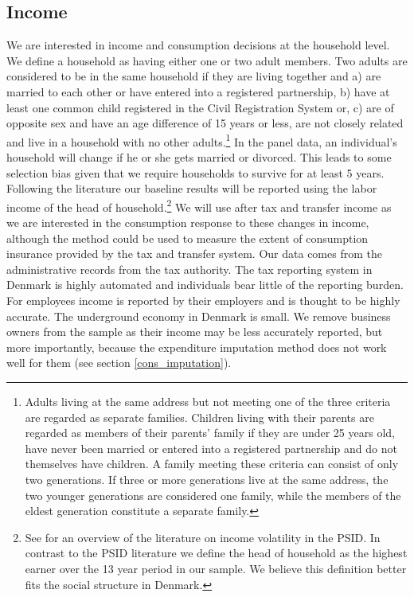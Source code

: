 \documentclass[titlepage]{\econtex}\newcommand{\texname}{ConsumptionHeterogeneity}
\begin{document}
\subsection{Income} \label{income}
We are interested in income and consumption decisions at the household level. We define a household as having either one or two adult members. Two adults are considered to be in the same household if they are living together and a) are married to each other or have entered into a registered partnership, b) have at least one common child registered in the Civil Registration System or, c) are of opposite sex and have an age difference of 15 years or less, are not closely related and live in a household with no other adults.\footnote{Adults living at the same address but not meeting one of the three criteria are regarded as separate families. Children living with their parents are regarded as members of their parents' family if they are under 25 years old, have never been married or entered into a registered partnership and do not themselves have children. A family meeting these criteria can consist of only two generations. If three or more generations live at the same address, the two younger generations are considered one family, while the members of the eldest generation constitute a separate family.} In the panel data, an individual's household will change if he or she gets married or divorced. This leads to some selection bias given that we require households to survive for at least 5 years. Following the literature our baseline results will be reported using the labor income of the head of household.\footnote{See \cite{moffitt_income_2018} for an overview of the literature on income volatility in the PSID. In contrast to the PSID literature we define the head of household as the highest earner over the 13 year period in our sample. We believe this definition better fits the social structure in Denmark.} We will use after tax and transfer income as we are interested in the consumption response to these changes in income, although the method could be used to measure the extent of consumption insurance provided by the tax and transfer system. Our data comes from the administrative records from the tax authority. The tax reporting system in Denmark is highly automated and individuals bear little of the reporting burden. For employees income is reported by their employers and is thought to be highly accurate. The underground economy in Denmark is small. We remove business owners from the sample as their income may be less accurately reported, but more importantly, because the expenditure imputation method does not work well for them (see section \ref{cons_imputation}).
\end{document}

